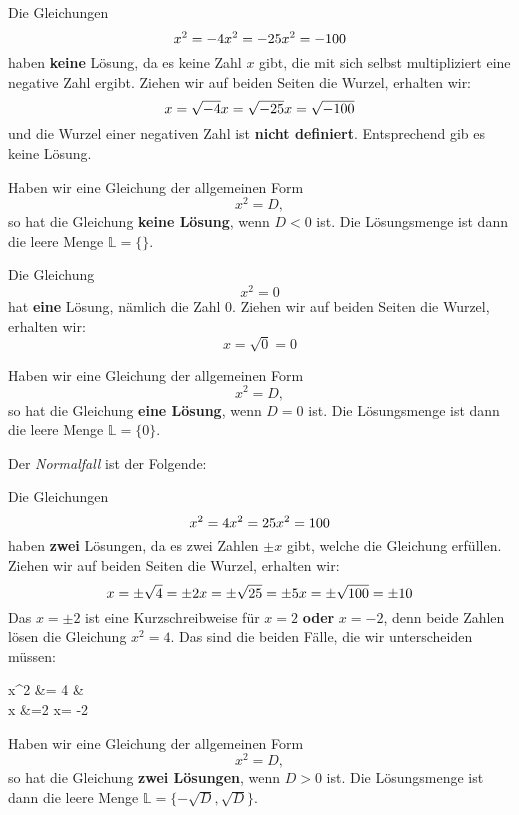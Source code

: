 \begin{example}
	Die Gleichungen
	\[ x^2 =-4 \\ x^2 =-25 \\ x^2= -100 \]
	haben \textbf{keine} Lösung, da es keine Zahl $x$ gibt, die mit sich selbst multipliziert eine negative Zahl ergibt. Ziehen wir auf beiden Seiten die Wurzel, erhalten wir:
	\[ x =\sqrt{-4} \\ x =\sqrt{-25} \\ x= \sqrt{-100} \]
	und die Wurzel einer negativen Zahl ist \textbf{nicht definiert}. Entsprechend gib es keine Lösung.
\end{example}
Haben wir eine Gleichung der allgemeinen Form
\[
x^2 = D,
\]
so hat die Gleichung \textbf{keine Lösung}, wenn $D<0$ ist. Die Lösungsmenge ist dann die leere Menge $\mathbb{L}= \{\}$.
\begin{example}
	Die Gleichung
	\[ x^2 = 0 \]
	hat \textbf{eine} Lösung, nämlich die Zahl 0. Ziehen wir auf beiden Seiten die Wurzel, erhalten wir:
	\[ x =\sqrt{0} = 0 \]
\end{example}
Haben wir eine Gleichung der allgemeinen Form
\[
x^2 = D,
\]
so hat die Gleichung \textbf{eine Lösung}, wenn $D=0$ ist. Die Lösungsmenge ist dann die leere Menge $\mathbb{L}= \{0\}$.

Der \textit{Normalfall} ist der Folgende:
\begin{example}
	Die Gleichungen
	\[ x^2 =4 \\ x^2 =25 \\ x^2= 100 \]
	haben \textbf{zwei} Lösungen, da es zwei Zahlen $\pm x$ gibt, welche die Gleichung erfüllen. Ziehen wir auf beiden Seiten die Wurzel, erhalten wir:
	\[ x =\pm \sqrt{4} = \pm 2 \\ x = \pm \sqrt{25} = \pm 5\\ x= \pm  \sqrt{100} = \pm 10 \]
	Das $x= \pm 2$ ist eine Kurzschreibweise für $x=2$ \textbf{oder} $x=-2$, denn beide Zahlen lösen die Gleichung $x^2=4$. Das sind die beiden Fälle, die wir unterscheiden müssen:
	  \begin{eqt}
		x^2 &= 4  & \sqrt{\square} \\
		\Leftrightarrow x &=2   x= -2
	\end{eqt}

\end{example}
Haben wir eine Gleichung der allgemeinen Form
\[
  x^2 = D,
\]
so hat die Gleichung \textbf{zwei Lösungen}, wenn $D>0$ ist. Die Lösungsmenge ist dann die leere Menge $\mathbb{L}= \{-\sqrt{D},\sqrt{D}\}$.

